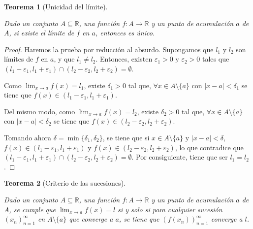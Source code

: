 \documentclass[
  a4paper,
]{scrreport}
\theoremstyle{definition}
\theoremstyle{plain}
\theoremstyle{definition}
\theoremstyle{definition}
\theoremstyle{plain}
\newtheorem{theorem}{Teorema}[chapter]
\theoremstyle{plain}
\theoremstyle{remark}
\begin{document}
\begin{theorem}[Unicidad del
límite]\protect\hypertarget{thm-unicidad-limite-funcion}{}\label{thm-unicidad-limite-funcion}

Dado un conjunto \(A\subseteq \mathbb{R}\), una función
\(f:A\to \mathbb{R}\) y un punto de acumulación \(a\) de \(A\), si
existe el límite de \(f\) en \(a\), entonces es único.

\end{theorem}

\begin{tcolorbox}[enhanced jigsaw, leftrule=.75mm, colbacktitle=quarto-callout-note-color!10!white, toprule=.15mm, opacityback=0, opacitybacktitle=0.6, toptitle=1mm, breakable, bottomtitle=1mm, colframe=quarto-callout-note-color-frame, rightrule=.15mm, titlerule=0mm, title=\textcolor{quarto-callout-note-color}{\faInfo}\hspace{0.5em}{Demostración}, arc=.35mm, left=2mm, bottomrule=.15mm, colback=white, coltitle=black]

\begin{proof}
Haremos la prueba por reducción al absurdo. Supongamos que \(l_1\) y
\(l_2\) son límites de \(f\) en \(a\), y que \(l_1\neq l_2\). Entonces,
existen \(\varepsilon_1>0\) y \(\varepsilon_2>0\) tales que
\((l_1-\varepsilon_1,l_1+\varepsilon_1)\cap (l_2-\varepsilon_2,l_2+\varepsilon_2)=\emptyset\).

Como \(\lim_{x\to a} f(x)=l_1\), existe \(\delta_1>0\) tal que,
\(\forall x\in A\setminus\{a\}\) con \(|x-a|<\delta_1\) se tiene que
\(f(x)\in (l_1-\varepsilon_1,l_1+\varepsilon_1)\).

Del mismo modo, como \(\lim_{x\to a} f(x)=l_2\), existe \(\delta_2>0\)
tal que, \(\forall x\in A\setminus\{a\}\) con \(|x-a|<\delta_2\) se
tiene que \(f(x)\in (l_2-\varepsilon_2,l_2+\varepsilon_2)\).

Tomando ahora \(\delta=\min\{\delta_1,\delta_2\}\), se tiene que si
\(x\in A\setminus\{a\}\) y \(|x-a|<\delta\),
\(f(x)\in (l_1-\varepsilon_1,l_1+\varepsilon_1)\) y
\(f(x)\in (l_2-\varepsilon_2,l_2+\varepsilon_2)\), lo que contradice que
\((l_1-\varepsilon_1,l_1+\varepsilon_1)\cap (l_2-\varepsilon_2,l_2+\varepsilon_2)=\emptyset\).
Por consiguiente, tiene que ser \(l_1=l_2\).
\end{proof}

\end{tcolorbox}

\begin{theorem}[Criterio de las
sucesiones]\protect\hypertarget{thm-criterio-sucesiones}{}\label{thm-criterio-sucesiones}

Dado un conjunto \(A\subseteq \mathbb{R}\), una función
\(f:A\to \mathbb{R}\) y un punto de acumulación \(a\) de \(A\), se
cumple que \(\lim_{x\to a}f(x)=l\) si y solo si para cualquier sucesión
\((x_n)_{n=1}^\infty\) en \(A\setminus\{a\}\) que converge a \(a\), se
tiene que \((f(x_n))_{n=1}^\infty\) converge a \(l\).

\end{theorem}
\end{document}
